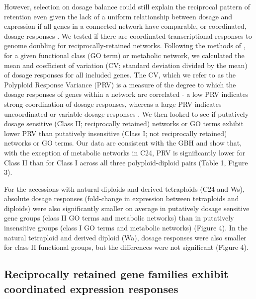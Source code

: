 \documentclass[11pt]{article}
\begin{document}
However, selection on dosage balance could still explain the reciprocal pattern of retention even given the lack of a uniform relationship between dosage and expression if all genes in a connected network have comparable, or coordinated, dosage responses \citep{coate2016}.  We tested if there are coordinated transcriptional responses to genome doubling for reciprocally-retained networks. Following the methods of \cite{coate2016}, for a given functional class (GO term) or metabolic network, we calculated the mean and coefficient of variation (CV; standard deviation divided by the mean) of dosage responses for all included genes. The CV, which we refer to as the Polyploid Response Variance (PRV) is a measure of the degree to which the dosage responses of genes within a network are correlated - a low PRV indicates strong coordination of dosage responses, whereas a large PRV indicates uncoordinated or variable dosage responses \citep{coate2016}. We then looked to see if putatively dosage sensitive (Class II; reciprocally retained) networks or GO terms exhibit lower PRV than putatively insensitive (Class I; not reciprocally retained) networks or GO terms.
Our data are consistent with the GBH and show that, with the exception of metabolic networks in C24, PRV is significantly lower for Class II than for Class I across all three polyploid-diploid pairs (Table 1, Figure 3).

For the accessions with natural diploids and derived tetraploids (C24 and Ws), absolute dosage responses (fold-change in expression between tetraploids and diploids) were also significantly smaller on average in putatively dosage sensitive gene groups (class II GO terms and metabolic networks) than in putatively insensitive groups (class I GO terms and metabolic networks) (Figure 4). In the natural tetraploid and derived diploid (Wa), dosage responses were also smaller for class II functional groups, but the differences were not significant (Figure 4).

\subsection*{Reciprocally retained gene families exhibit coordinated expression responses}
\end{document}

